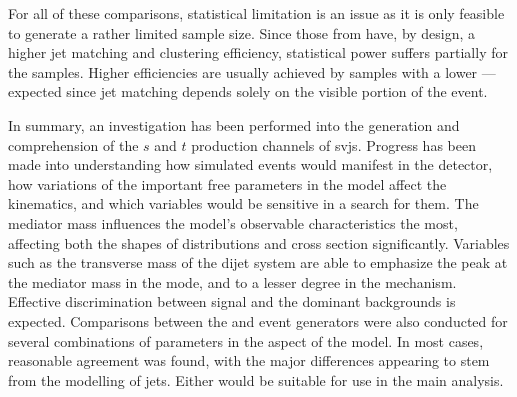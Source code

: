 For all of these comparisons, statistical limitation is an issue as it is only feasible to generate a rather limited sample size. Since those from \PYTHIA have, by design, a higher \gls{jet} matching and clustering efficiency, statistical power suffers partially for the \MADGRAPH samples. Higher efficiencies are usually achieved by samples with a lower \rinv---expected since \gls{jet} matching depends solely on the visible portion of the event.

In summary, an investigation has been performed into the generation and comprehension of the $s$ and $t$ production channels of \glspl{svj}. Progress has been made into understanding how simulated events would manifest in the detector, how variations of the important free parameters in the model affect the kinematics, and which variables would be sensitive in a search for them. The mediator mass influences the model's observable characteristics the most, affecting both the shapes of distributions and cross section significantly. Variables such as the transverse mass of the dijet system are able to emphasize the peak at the mediator mass in the \schannel mode, and to a lesser degree in the \tchannel mechanism. Effective discrimination between signal and the dominant backgrounds is expected. Comparisons between the \MGvATNLO and \PYTHIAEIGHT event generators were also conducted for several combinations of parameters in the \schannel aspect of the model. In most cases, reasonable agreement was found, with the major differences appearing to stem from the modelling of \glspl{jet}. Either would be suitable for use in the main analysis.


